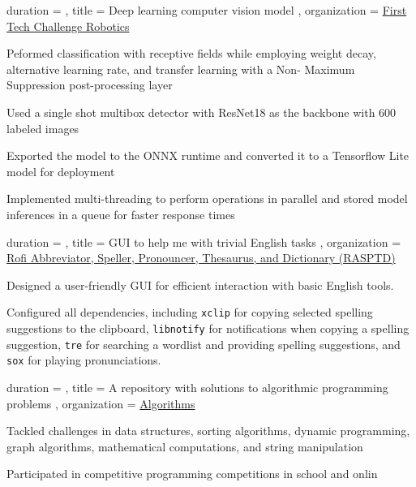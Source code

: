 \documentclass[sidebar-width=2.25in, primary=slate]{clean-resume}
\begin{document}
    \begin{experience}
      {
        duration = {  },
        title = { Deep learning computer vision model },
        organization = {\href{https://github.com/FIRST-Tech-Challenge/FtcRobotController}{First Tech Challenge Robotics} }
      }
      \item Peformed classification with receptive fields while employing weight decay, alternative learning rate, and transfer learning with a Non-
      Maximum Suppression post-processing layer
      \item Used a single shot multibox detector with ResNet18 as the backbone with 600 labeled images
      \item Exported the model to the ONNX runtime and converted it to a Tensorflow Lite model for deployment
      \item Implemented multi-threading to perform operations in parallel and stored model inferences in a queue for faster response times
    \end{experience}

    \begin{experience}
      {
        duration = {  },
        title = { GUI to help me with trivial English tasks },
        organization = { \href{https://github.com/anishgoyal1108/RASPTD}{Rofi Abbreviator, Speller, Pronouncer, Thesaurus, and Dictionary (RASPTD)} }
      }
      \item Designed a user-friendly GUI for efficient interaction with basic English tools.
      \item Configured all dependencies, including \verb|xclip| for copying selected spelling suggestions to the clipboard, \verb|libnotify| for notifications when copying a spelling suggestion, \verb|tre| for searching a wordlist and providing spelling suggestions, and \verb|sox| for playing pronunciations.
    \end{experience}
    
    \begin{experience}
      {
        duration = {  },
        title = { A repository with solutions to algorithmic programming problems },
        organization = { \href{https://github.com/Yubo-Cao/algorithms}{Algorithms} }
      }
      \item Tackled challenges in data structures, sorting algorithms, dynamic programming, graph algorithms, mathematical computations, and string manipulation
      \item Participated in competitive programming competitions in school and onlin
    \end{experience}
\end{document}
